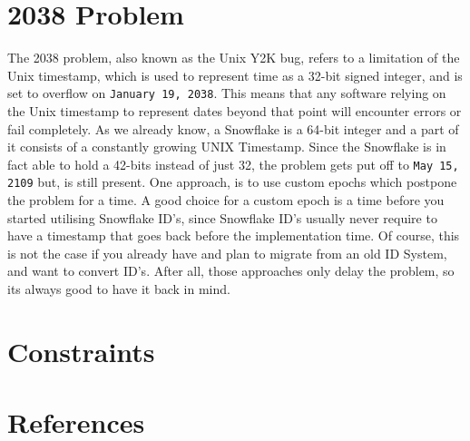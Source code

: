 \documentclass{article}
\newcommand{\code}[1]{\colorbox{cverbbg}{\texttt{#1}}}
\newcommand{\hn}[0]{\hfill \newline}
\begin{document}
\section{2038 Problem}
The 2038 problem, also known as the Unix Y2K bug, refers to a limitation of the Unix timestamp, which is used to represent time as a 32-bit signed integer, and is set to overflow on \code{January 19, 2038}. This means that any software relying on the Unix timestamp to represent dates beyond that point will encounter errors or fail completely. \newline
\hn
As we already know, a Snowflake is a 64-bit integer and a part of it consists of a constantly growing UNIX Timestamp. Since the Snowflake is in fact able to hold a 42-bits instead of just 32, the problem gets put off to \code{May 15, 2109} but, is still present. \newline
\hn
One approach, is to use custom epochs which postpone the problem for a time. A good choice for a custom epoch is a time before you started utilising Snowflake ID's, since Snowflake ID's usually never require to have a timestamp that goes back before the implementation time. \newline
Of course, this is not the case if you already have and plan to migrate from an old ID System, and want to convert ID's. \newline
\hn
After all, those approaches only delay the problem, so its always good to have it back in mind.

\section{Constraints}
\section{References}
\end{document}
